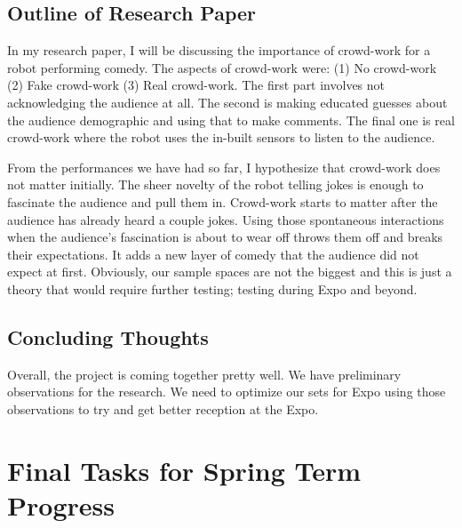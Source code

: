 \documentclass[onecolumn, draftclsnofoot,10pt, compsoc]{IEEEtran}
\begin{document}
\subsection{Outline of Research Paper}
In my research paper, I will be discussing the importance of crowd-work for a robot performing comedy. The aspects of crowd-work were: (1) No crowd-work (2) Fake crowd-work (3) Real crowd-work. The first part involves not acknowledging the audience at all. The second is making educated guesses about the audience demographic and using that to make comments. The final one is real crowd-work where the robot uses the in-built sensors to listen to the audience.

From the performances we have had so far, I hypothesize that crowd-work does not matter initially. The sheer novelty of the robot telling jokes is enough to fascinate the audience and pull them in. Crowd-work starts to matter after the audience has already heard a couple jokes. Using those spontaneous interactions when the audience's fascination is about to wear off throws them off and breaks their expectations. It adds a new layer of comedy that the audience did not expect at first. Obviously, our sample spaces are not the biggest and this is just a theory that would require further testing; testing during Expo and beyond. 

\subsection{Concluding Thoughts}
Overall, the project is coming together pretty well. We have preliminary observations for the research. We need to optimize our sets for Expo using those observations to try and get better reception at the Expo. 

\section{Final Tasks for Spring Term Progress}
\end{document}
